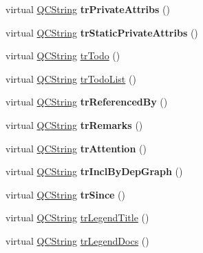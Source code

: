 \begin{DoxyCompactItemize}
virtual \mbox{\hyperlink{class_q_c_string}{Q\+C\+String}} {\bfseries tr\+Private\+Attribs} ()
\item 
\mbox{\label{class_translator_portuguese_a040407fd5e3edb7dccef31125e516bf0}} 
virtual \mbox{\hyperlink{class_q_c_string}{Q\+C\+String}} {\bfseries tr\+Static\+Private\+Attribs} ()
\item 
virtual \mbox{\hyperlink{class_q_c_string}{Q\+C\+String}} \mbox{\hyperlink{class_translator_portuguese_a46ac2098ecd31776077a2569a9dea98c}{tr\+Todo}} ()
\item 
virtual \mbox{\hyperlink{class_q_c_string}{Q\+C\+String}} \mbox{\hyperlink{class_translator_portuguese_a43b46ba22ded4a4e5e310b54c8f3f974}{tr\+Todo\+List}} ()
\item 
\mbox{\label{class_translator_portuguese_a417029d7552f0fa1cf47a13e31c5c9ca}} 
virtual \mbox{\hyperlink{class_q_c_string}{Q\+C\+String}} {\bfseries tr\+Referenced\+By} ()
\item 
\mbox{\label{class_translator_portuguese_a7e7dc1b2bd0b5d50a33b2daf42506773}} 
virtual \mbox{\hyperlink{class_q_c_string}{Q\+C\+String}} {\bfseries tr\+Remarks} ()
\item 
\mbox{\label{class_translator_portuguese_a656d5e7d149e472df56321268be134c7}} 
virtual \mbox{\hyperlink{class_q_c_string}{Q\+C\+String}} {\bfseries tr\+Attention} ()
\item 
\mbox{\label{class_translator_portuguese_adb0c18d9781b97a6b25ad270d2d8fd8e}} 
virtual \mbox{\hyperlink{class_q_c_string}{Q\+C\+String}} {\bfseries tr\+Incl\+By\+Dep\+Graph} ()
\item 
\mbox{\label{class_translator_portuguese_a2fdb2df553114fd8e154468843cb8e71}} 
virtual \mbox{\hyperlink{class_q_c_string}{Q\+C\+String}} {\bfseries tr\+Since} ()
\item 
virtual \mbox{\hyperlink{class_q_c_string}{Q\+C\+String}} \mbox{\hyperlink{class_translator_portuguese_aca84c936f331401ecbe3393039706323}{tr\+Legend\+Title}} ()
\item 
virtual \mbox{\hyperlink{class_q_c_string}{Q\+C\+String}} \mbox{\hyperlink{class_translator_portuguese_a8a5badb531a9d6a88861de122587d254}{tr\+Legend\+Docs}} ()

\end{DoxyCompactItemize}
